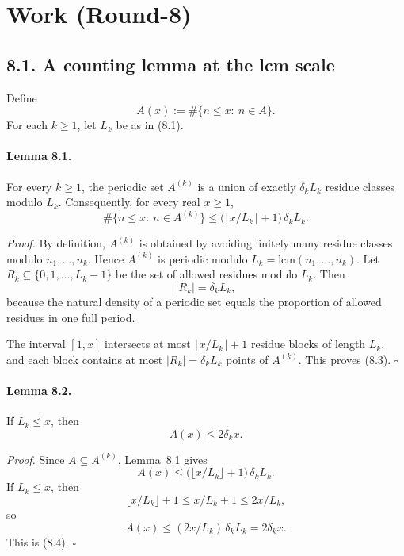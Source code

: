 \section{Work (Round-8)}
\subsection*{8.1. A counting lemma at the lcm scale}
Define
\begin{equation}
A(x):=\#\{n\le x:\ n\in A\}.
\tag{8.2}
\end{equation}
For each $k\ge 1$, let $L_k$ be as in (8.1).

\paragraph{Lemma 8.1.}
For every $k\ge 1$, the periodic set $A^{(k)}$ is a union of exactly $\delta_k L_k$ residue classes modulo $L_k$.
Consequently, for every real $x\ge 1$,
\begin{equation}
\#\{n\le x:\ n\in A^{(k)}\}
\le
\bigl(\lfloor x/L_k\rfloor+1\bigr)\,\delta_k L_k.
\tag{8.3}
\end{equation}

\emph{Proof.}
By definition, $A^{(k)}$ is obtained by avoiding finitely many residue classes modulo $n_1,\dots,n_k$.
Hence $A^{(k)}$ is periodic modulo $L_k=\mathrm{lcm}(n_1,\dots,n_k)$.
Let $R_k\subseteq\{0,1,\dots,L_k-1\}$ be the set of allowed residues modulo $L_k$.
Then
\[
|R_k|=\delta_k L_k,
\]
because the natural density of a periodic set equals the proportion of allowed residues in one full period.

The interval $[1,x]$ intersects at most $\lfloor x/L_k\rfloor+1$ residue blocks of length $L_k$, and each block contains at most $|R_k|=\delta_k L_k$ points of $A^{(k)}$.  This proves (8.3). \hfill $\square$

\paragraph{Lemma 8.2.}
If $L_k\le x$, then
\begin{equation}
A(x)\le 2\delta_k x.
\tag{8.4}
\end{equation}

\emph{Proof.}
Since $A\subseteq A^{(k)}$, Lemma~8.1 gives
\[
A(x)
\le
\bigl(\lfloor x/L_k\rfloor+1\bigr)\,\delta_k L_k.
\]
If $L_k\le x$, then
\[
\lfloor x/L_k\rfloor+1\le x/L_k+1\le 2x/L_k,
\]
so
\[
A(x)\le (2x/L_k)\,\delta_k L_k=2\delta_k x.
\]
This is (8.4). \hfill $\square$

